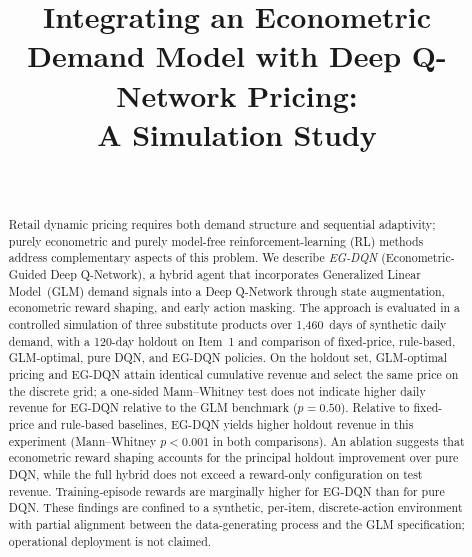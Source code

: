 \documentclass[journal, 10pt, twoside]{IEEEtran}
\begin{document}
\title{%
  Integrating an Econometric Demand Model with Deep Q-Network Pricing:\\
  A Simulation Study%
}

\author{%
  \\
}

\maketitle

\begin{abstract}
Retail dynamic pricing requires both demand structure and sequential
adaptivity; purely econometric and purely model-free reinforcement-learning
(RL) methods address complementary aspects of this problem.
We describe \textit{EG-DQN} (Econometric-Guided Deep Q-Network), a hybrid
agent that incorporates Generalized Linear Model~(GLM) demand signals into
a Deep Q-Network through state augmentation, econometric reward shaping,
and early action masking.
The approach is evaluated in a controlled simulation of three substitute
products over 1{,}460~days of synthetic daily demand, with a 120-day
holdout on Item~1 and comparison of fixed-price, rule-based, GLM-optimal,
pure DQN, and EG-DQN policies.
On the holdout set, GLM-optimal pricing and EG-DQN attain identical
cumulative revenue and select the same price on the discrete grid; a
one-sided Mann--Whitney test does not indicate higher daily revenue for
EG-DQN relative to the GLM benchmark ($p=0.50$).
Relative to fixed-price and rule-based baselines, EG-DQN yields higher
holdout revenue in this experiment (Mann--Whitney $p<0.001$ in both
comparisons).
An ablation suggests that econometric reward shaping accounts for the
principal holdout improvement over pure DQN, while the full hybrid does
not exceed a reward-only configuration on test revenue.
Training-episode rewards are marginally higher for EG-DQN than for pure
DQN.
These findings are confined to a synthetic, per-item, discrete-action
environment with partial alignment between the data-generating process
and the GLM specification; operational deployment is not claimed.
\end{abstract}
\end{document}
